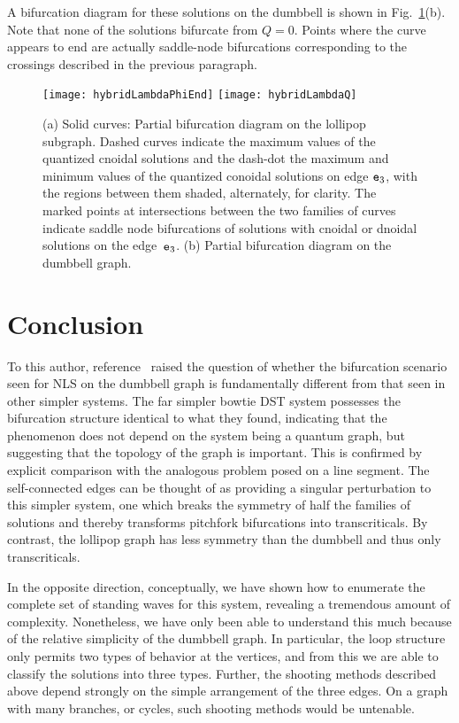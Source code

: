 \documentclass{article}
\numberwithin{equation}{section}
\numberwithin{figure}{section}
\begin{document}
A bifurcation diagram for these solutions on the dumbbell is shown in Fig.~\ref{fig:hybridLambda}(b). Note that none of the solutions bifurcate from $Q=0$. Points where the curve appears to end are actually saddle-node bifurcations corresponding to the crossings described in the previous paragraph.


\begin{figure}[htbp] %
   \centering
   \texttt{[image: hybridLambdaPhiEnd]} 
   \texttt{[image: hybridLambdaQ]} 
   \caption{(a) Solid curves: Partial bifurcation diagram on the lollipop subgraph. Dashed curves indicate the maximum values of the quantized cnoidal solutions and the dash-dot the maximum and minimum values of the quantized conoidal solutions on edge $\mathtt{e}_3$, with the regions between them shaded, alternately, for clarity. The marked points at intersections between the two families of curves indicate saddle node bifurcations of solutions with cnoidal or dnoidal solutions on the edge~$\mathtt{e}_3$. (b) Partial bifurcation diagram on the dumbbell graph.  }
\label{fig:hybridLambda}
\end{figure}

\section{Conclusion}
\label{sec:conclusion}

To this author, reference~\cite{Marzuola:2016bl} raised the question of whether the bifurcation scenario seen for NLS on the dumbbell graph is fundamentally different from that seen in other simpler systems. The far simpler bowtie DST system possesses the bifurcation structure identical to what they found, indicating that the phenomenon does not depend on the system being a quantum graph, but suggesting that the topology of the graph is important. This is confirmed by explicit comparison with the analogous problem posed on a line segment. The self-connected edges can be thought of as providing a singular perturbation to this simpler system, one which breaks the symmetry of half the families of solutions and thereby transforms pitchfork bifurcations into transcriticals. By contrast, the lollipop graph has less symmetry than the dumbbell and thus only transcriticals. 

In the opposite direction, conceptually, we have shown how to enumerate the complete set of standing waves for this system, revealing a tremendous amount of complexity. Nonetheless, we have only been able to understand this much because of the relative simplicity of the dumbbell graph. In particular, the loop structure only permits two types of behavior at the vertices, and from this we are able to classify the solutions into three types. Further, the shooting methods described above depend strongly on the simple arrangement of the three edges. On a graph with many branches, or cycles, such shooting methods would be untenable.
\end{document}
